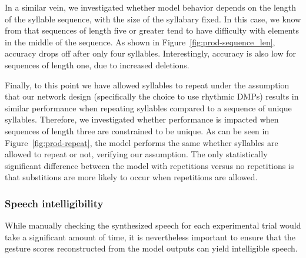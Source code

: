 In a similar vein,
we investigated whether model behavior
depends on the length of the syllable sequence,
with the size of the syllabary fixed.
In this case, we know from \citet{choo2010}
that sequences of length five or greater
tend to have difficulty with elements
in the middle of the sequence.
As shown in Figure~\ref{fig:prod-sequence_len},
accuracy drops off after only four syllables.
Interestingly, accuracy is also low
for sequences of length one,
due to increased deletions.


Finally, to this point we have
allowed syllables to repeat
under the assumption that our network design
(specifically the choice to use rhythmic DMPs)
results in similar performance when
repeating syllables compared to
a sequence of unique syllables.
Therefore, we investigated whether
performance is impacted when
sequences of length three
are constrained to be unique.
As can be seen in Figure~\ref{fig:prod-repeat},
the model performs the same
whether syllables are allowed to repeat or not,
verifying our assumption.
The only statistically significant difference
between the model with repetitions
versus no repetitions
is that substitions are more likely
to occur when repetitions are allowed.

\subsubsection{Speech intelligibility}

While manually checking the synthesized speech
for each experimental trial
would take a significant amount of time,
it is nevertheless important
to ensure that the gesture scores
reconstructed from the model outputs
can yield intelligible speech.

